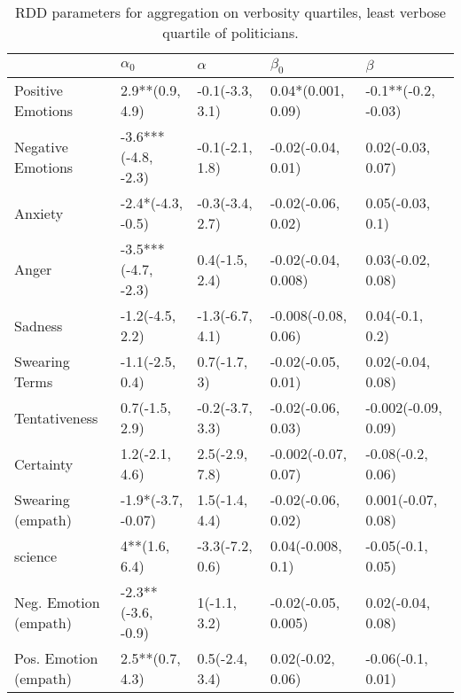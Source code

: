 \begin{table}[h]\centering
\caption{RDD parameters for aggregation on verbosity quartiles, least verbose quartile of politicians.}
	\label{fig: Verbosity_7}
\begin{adjustbox}{width=\linewidth, center}
	\begin{tabular}{lllll}
	\toprule
	{} &           $\alpha_0$ &         $\alpha$ &            $\beta_0$ &              $\beta$ \\
	\midrule
	Positive Emotions     &      2.9**(0.9, 4.9) &  -0.1(-3.3, 3.1) &   0.04*(0.001, 0.09) &  -0.1**(-0.2, -0.03) \\
	Negative Emotions     &  -3.6***(-4.8, -2.3) &  -0.1(-2.1, 1.8) &   -0.02(-0.04, 0.01) &    0.02(-0.03, 0.07) \\
	Anxiety               &    -2.4*(-4.3, -0.5) &  -0.3(-3.4, 2.7) &   -0.02(-0.06, 0.02) &     0.05(-0.03, 0.1) \\
	Anger                 &  -3.5***(-4.7, -2.3) &   0.4(-1.5, 2.4) &  -0.02(-0.04, 0.008) &    0.03(-0.02, 0.08) \\
	Sadness               &      -1.2(-4.5, 2.2) &  -1.3(-6.7, 4.1) &  -0.008(-0.08, 0.06) &      0.04(-0.1, 0.2) \\
	Swearing Terms        &      -1.1(-2.5, 0.4) &     0.7(-1.7, 3) &   -0.02(-0.05, 0.01) &    0.02(-0.04, 0.08) \\
	Tentativeness         &       0.7(-1.5, 2.9) &  -0.2(-3.7, 3.3) &   -0.02(-0.06, 0.03) &  -0.002(-0.09, 0.09) \\
	Certainty             &       1.2(-2.1, 4.6) &   2.5(-2.9, 7.8) &  -0.002(-0.07, 0.07) &    -0.08(-0.2, 0.06) \\
	Swearing (empath)     &   -1.9*(-3.7, -0.07) &   1.5(-1.4, 4.4) &   -0.02(-0.06, 0.02) &   0.001(-0.07, 0.08) \\
	science               &        4**(1.6, 6.4) &  -3.3(-7.2, 0.6) &    0.04(-0.008, 0.1) &    -0.05(-0.1, 0.05) \\
	Neg. Emotion (empath) &   -2.3**(-3.6, -0.9) &     1(-1.1, 3.2) &  -0.02(-0.05, 0.005) &    0.02(-0.04, 0.08) \\
	Pos. Emotion (empath) &      2.5**(0.7, 4.3) &   0.5(-2.4, 3.4) &    0.02(-0.02, 0.06) &    -0.06(-0.1, 0.01) \\
	\bottomrule
	\end{tabular}
	
\end{adjustbox}
	\end{table}

